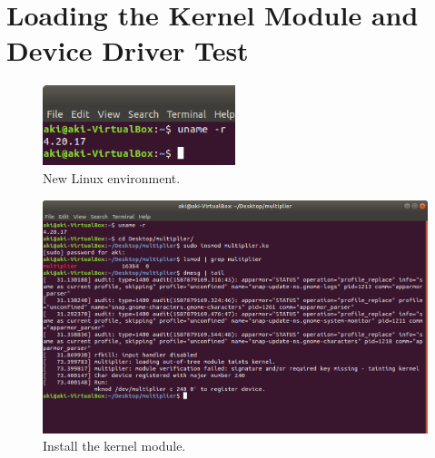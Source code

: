 \documentclass[11pt,letterpaper,titlepage]{article}
\begin{document}
\newpage

\section{Loading the Kernel Module and Device Driver Test}

\begin{figure}[ht]
    \centering
    \includegraphics[width=0.5\textwidth]{6.new linux environment.png}
    \caption{New Linux environment.}
\end{figure}

\begin{figure}[ht]
    \centering
    \includegraphics[width=\textwidth]{7.insmod.png}
    \caption{Install the kernel module.}
\end{figure}

\newpage
\end{document}
